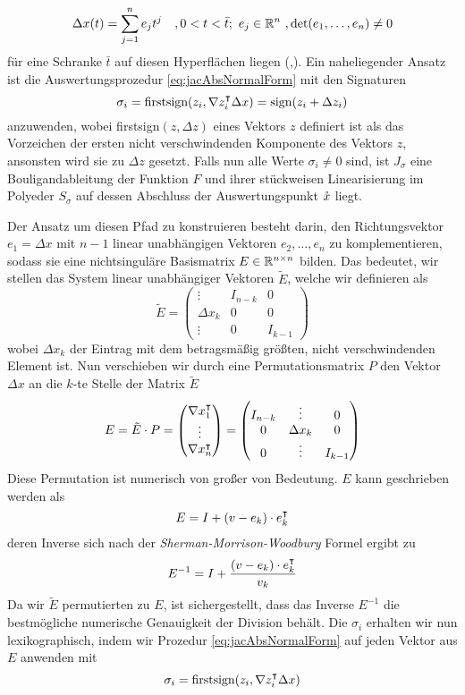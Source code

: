 \begin{equation}
 \Delta x(t) = \sum_{j=1}^n e_j t^j \quad ,0<t<\bar t;~e_j\in \mathbb{R}^n ~,\det(e_1,\ldots,e_n)\neq 0
\end{equation}
für eine Schranke $\bar t$ auf diesen Hyperflächen liegen (\cite[Proposition 6]{monster},\cite[S.11]{plan}). 
Ein naheliegender Ansatz ist die Auswertungsprozedur \eqref{eq:jacAbsNormalForm} mit den Signaturen
\[
 \sigma_i = \text{firstsign}(z_i,\nabla z_i^\intercal\Delta x) = \text{sign}(z_i+\Delta z_i)
\]
anzuwenden, wobei firstsign$(z,\Delta z)$ eines Vektors $z$ definiert ist als das Vorzeichen der ersten nicht verschwindenden Komponente des Vektors $z$, ansonsten wird sie zu $\Delta z$ gesetzt. Falls nun alle Werte $\sigma_i \neq 0$ sind, ist $J_\sigma$ eine Bouligandableitung der Funktion $F$ und ihrer stückweisen Linearisierung im Polyeder $S_\sigma$ auf dessen Abschluss der Auswertungspunkt $\mathring{x}$ liegt.

Der Ansatz um diesen Pfad zu konstruieren besteht darin, den Richtungsvektor $e_1 = \Delta x$ mit $n-1$ linear unabhängigen Vektoren $e_2,\ldots, e_n$ zu komplementieren, sodass sie eine nichtsinguläre Basismatrix $E\in \mathbb{R}^{n\times n}$ bilden.
Das bedeutet, wir stellen das System linear unabhängiger Vektoren $\tilde E$, welche wir definieren als
\[
\tilde E = 
 \begin{pmatrix}
  \vdots   & I_{n-k} & 0 \\
  \Delta x_k & 0&0\\
  \vdots   & 0&I_{k-1}
 \end{pmatrix}
\]
wobei $\Delta x_k$ der Eintrag mit dem betragsmäßig größten, nicht verschwindenden Element ist. Nun verschieben wir durch eine Permutationsmatrix $P$ den Vektor $\Delta x$ an die $k$-te Stelle der Matrix $\tilde E$
\[
E = \tilde E \cdot P=
\begin{pmatrix}
  \nabla x_1^\intercal\\
  \vdots\\
  \nabla x_n^\intercal\\
 \end{pmatrix}
 =
  \begin{pmatrix}
   I_{n-k} & \vdots &0\\
  0 & \Delta x_k & 0\\
    0 & \vdots&I_{k-1}
 \end{pmatrix}
\]
Diese Permutation ist numerisch von großer von Bedeutung. $E$ kann geschrieben werden als
\[
  E = I + (v-e_k)\cdot e_k^\intercal 
\] 
deren Inverse sich nach der \textit{Sherman-Morrison-Woodbury} Formel ergibt zu
\[
 E^{-1} = I + \frac{(v-e_k)\cdot e_k^\intercal}{v_k}
\]
Da wir $\tilde E$ permutierten zu $E$, ist sichergestellt, dass das Inverse $E^{-1}$ die bestmögliche numerische Genauigkeit der Division behält.
Die $\sigma_i$ erhalten wir nun lexikographisch, indem wir Prozedur \eqref{eq:jacAbsNormalForm} auf jeden Vektor aus $E$ anwenden mit 
\[
  \sigma_i = \text{firstsign}(z_i,\nabla z_i^\intercal\Delta x)
\]

